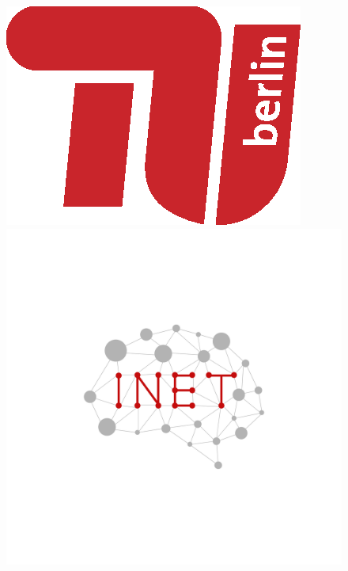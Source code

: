 \documentclass[a4paper, 12pt]{report}
\begin{document}
	\begin{titlepage} 
		\begin{centering}
			
			\begin{figure}[!h]
				\begin{minipage}{0.4\linewidth}
					\begin{center}
						\includegraphics[scale=0.8]{resources/images/tu-logo.eps} 
					\end{center}  
				\end{minipage}
				\hfill
				\begin{minipage}{0.45\linewidth} 
					\begin{center}
						\includegraphics[scale=0.1]{resources/images/inet-logo.png} 
					\end{center}    
				\end{minipage}
			\end{figure}
			

\end{centering}
\end{titlepage}
\end{document}
